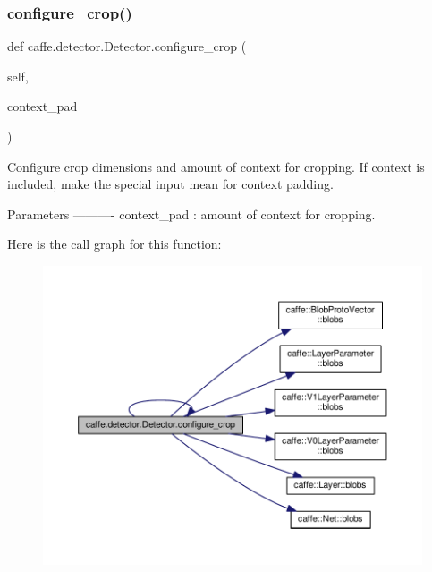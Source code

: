 \mbox{\label{classcaffe_1_1detector_1_1_detector_a3706bb8bcd04387c065f7bb6b34f4875}} 
\subsubsection{\texorpdfstring{configure\+\_\+crop()}{configure\_crop()}\hspace{0.1cm}{\footnotesize\ttfamily [2/2]}}
{\footnotesize\ttfamily def caffe.\+detector.\+Detector.\+configure\+\_\+crop (\begin{DoxyParamCaption}\item[{}]{self,  }\item[{}]{context\+\_\+pad }\end{DoxyParamCaption})}

\begin{DoxyVerb}Configure crop dimensions and amount of context for cropping.
If context is included, make the special input mean for context padding.

Parameters
----------
context_pad : amount of context for cropping.
\end{DoxyVerb}
 Here is the call graph for this function\+:
\nopagebreak
\begin{figure}[H]
\begin{center}
\leavevmode
\includegraphics[width=350pt]{classcaffe_1_1detector_1_1_detector_a3706bb8bcd04387c065f7bb6b34f4875_cgraph}
\end{center}
\end{figure}
\mbox{\label{classcaffe_1_1detector_1_1_detector_af71bb7e173a228c2e1577b9125310216}} 
